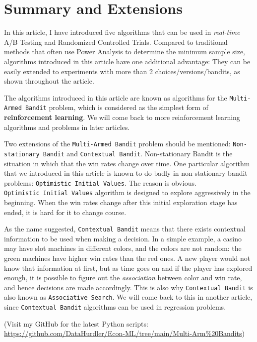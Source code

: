 \documentclass[
]{book}
\theoremstyle{definition}
\theoremstyle{definition}
\theoremstyle{definition}
\theoremstyle{definition}
\theoremstyle{remark}
\begin{document}
\hypertarget{summary-and-extensions}{%
\section{Summary and Extensions}\label{summary-and-extensions}}

In this article, I have introduced five algorithms that can be used in \emph{real-time} A/B Testing and Randomized Controlled Trials. Compared to traditional methods that often use Power Analysis to determine the minimum sample size, algorithms introduced in this article have one additional advantage: They can be easily extended to experiments with more than 2 choices/versions/bandits, as shown throughout the article.

The algorithms introduced in this article are known as algorithms for the \texttt{Multi-Armed\ Bandit} problem, which is considered as the simplest form of \textbf{reinforcement learning}. We will come back to more reinforcement learning algorithms and problems in later articles.

Two extensions of the \texttt{Multi-Armed\ Bandit} problem should be mentioned: \texttt{Non-stationary\ Bandit} and \texttt{Contextual\ Bandit}. Non-stationary Bandit is the situation in which that the win rates change over time. One particular algorithm that we introduced in this article is known to do badly in non-stationary bandit problems: \texttt{Optimistic\ Initial\ Values}. The reason is obvious. \texttt{Optimistic\ Initial\ Values} algorithm is designed to explore aggressively in the beginning. When the win rates change after this initial exploration stage has ended, it is hard for it to change course.

As the name suggested, \texttt{Contextual\ Bandit} means that there exists contextual information to be used when making a decision. In a simple example, a casino may have slot machines in different colors, and the colors are not random: the green machines have higher win rates than the red ones. A new player would not know that information at first, but as time goes on and if the player has explored enough, it is possible to figure out the \emph{association} between color and win rate, and hence decisions are made accordingly. This is also why \texttt{Contextual\ Bandit} is also known as \texttt{Associative\ Search}. We will come back to this in another article, since \texttt{Contextual\ Bandit} algorithms can be used in regression problems.

(Visit my GitHub for the latest Python scripts: \url{https://github.com/DataHurdler/Econ-ML/tree/main/Multi-Arm\%20Bandits})
\end{document}
